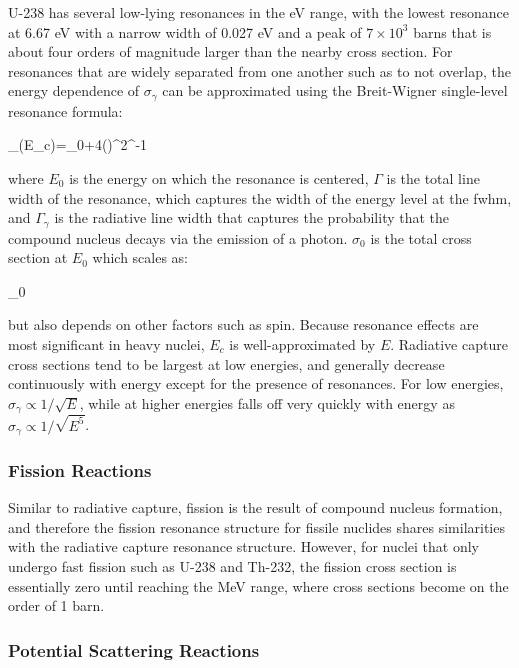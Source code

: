 U-238 has several low-lying resonances in the eV range, with the lowest resonance at 6.67 eV with a narrow width of 0.027 eV and a peak of \(7\times10^3\) barns that is about four orders of magnitude larger than the nearby cross section. For resonances that are widely separated from one another such as to not overlap, the energy dependence of \(\sigma_\gamma\) can be approximated using the Breit-Wigner single-level resonance formula:

\beq
\label{eq:BW}
\sigma_\gamma(E_c)=\sigma_0\frac{\Gamma_\gamma}{\Gamma}\left{}+4\left(\right)^2\right\rbrack^{-1}
\eeq

where \(E_0\) is the energy on which the resonance is centered, \(\Gamma\) is the total line width of the resonance, which captures the width of the energy level at the \gls{fwhm}, and \(\Gamma_\gamma\) is the radiative line width that captures the probability that the compound nucleus decays via the emission of a photon. \(\sigma_0\) is the total cross section at \(E_0\) which scales as:

\beq
\sigma_0\propto{}
\eeq

but also depends on other factors such as spin. Because resonance effects are most significant in heavy nuclei, \(E_c\) is well-approximated by \(E\). Radiative capture cross sections tend to be largest at low energies, and generally decrease continuously with energy except for the presence of resonances. For low energies, \(\sigma_\gamma\propto1/\sqrt{E}\), while at higher energies falls off very quickly with energy as \(\sigma_\gamma\propto1/\sqrt{E^5}\).

\subsubsection{Fission Reactions}

Similar to radiative capture, fission is the result of compound nucleus formation, and therefore the fission resonance structure for fissile nuclides shares similarities with the radiative capture resonance structure. However, for nuclei that only undergo fast fission such as U-238 and Th-232, the fission cross section is essentially zero until reaching the MeV range, where cross sections become on the order of 1 barn.

\subsubsection{Potential Scattering Reactions}
\label{sec:PotentialScattering}

